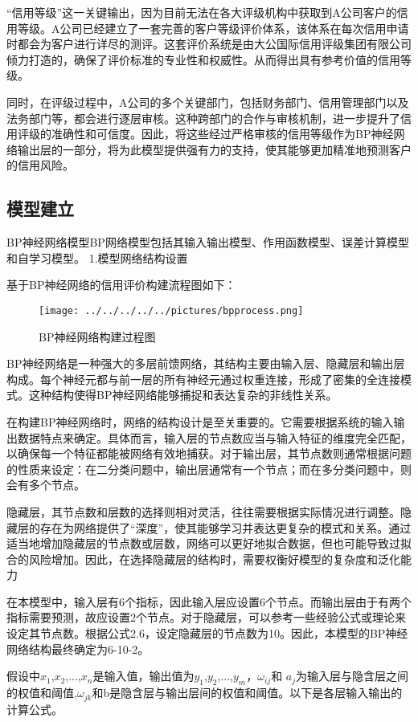 “信用等级”这一关键输出，因为目前无法在各大评级机构中获取到A公司客户的信用等级。A公司已经建立了一套完善的客户等级评价体系，该体系在每次信用申请时都会为客户进行详尽的测评。这套评价系统是由大公国际信用评级集团有限公司倾力打造的，确保了评价标准的专业性和权威性。从而得出具有参考价值的信用等级。

同时，在评级过程中，A公司的多个关键部门，包括财务部门、信用管理部门以及法务部门等，都会进行逐层审核。这种跨部门的合作与审核机制，进一步提升了信用评级的准确性和可信度。因此，将这些经过严格审核的信用等级作为BP神经网络输出层的一部分，将为此模型提供强有力的支持，使其能够更加精准地预测客户的信用风险。

\subsection{模型建立}
BP神经网络模型BP网络模型包括其输入输出模型、作用函数模型、误差计算模型和自学习模型。
1.模型网络结构设置

基于BP神经网络的信用评价构建流程图如下：

\begin{figure}[!h]
	\centering
	\texttt{[image: ../../../../../pictures/bpprocess.png]}
	\caption{BP神经网络构建过程图}
\end{figure} 

BP神经网络是一种强大的多层前馈网络，其结构主要由输入层、隐藏层和输出层构成。每个神经元都与前一层的所有神经元通过权重连接，形成了密集的全连接模式。这种结构使得BP神经网络能够捕捉和表达复杂的非线性关系。

在构建BP神经网络时，网络的结构设计是至关重要的。它需要根据系统的输入输出数据特点来确定。具体而言，输入层的节点数应当与输入特征的维度完全匹配，以确保每一个特征都能被网络有效地捕获。对于输出层，其节点数则通常根据问题的性质来设定：在二分类问题中，输出层通常有一个节点；而在多分类问题中，则会有多个节点。

隐藏层，其节点数和层数的选择则相对灵活，往往需要根据实际情况进行调整。隐藏层的存在为网络提供了“深度”，使其能够学习并表达更复杂的模式和关系。通过适当地增加隐藏层的节点数或层数，网络可以更好地拟合数据，但也可能导致过拟合的风险增加。因此，在选择隐藏层的结构时，需要权衡好模型的复杂度和泛化能力

在本模型中，输入层有6个指标，因此输入层应设置6个节点。而输出层由于有两个指标需要预测，故应设置2个节点。对于隐藏层，可以参考一些经验公式或理论来设定其节点数。根据公式2.6，设定隐藏层的节点数为10。因此，本模型的BP神经网络结构最终确定为6-10-2。

假设中$x_1$,$x_2$,...,$x_n$是输入值，输出值为$y_1$,$y_2$,...,$y_m$，$\omega_{ij}$和 $a_j$为输入层与隐含层之间的权值和阈值,$\omega_{jk}$和b是隐含层与输出层间的权值和阈值。以下是各层输入输出的计算公式。

